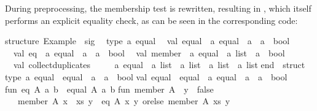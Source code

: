 \begin{isabellebody}
{\isafoldquote}%
%
\isadelimquote
%
\endisadelimquote
%
\begin{isamarkuptext}%
\noindent During preprocessing, the membership test is rewritten,
  resulting in , which itself performs an explicit
  equality check, as can be seen in the corresponding  code:%
\end{isamarkuptext}%
\isamarkuptrue%
%
\isadelimquote
%
\endisadelimquote
%
\isatagquote
%
\begin{isamarkuptext}%
\begin{typewriter}
    structure\ Example\ {\isacharcolon}\ sig\isanewline
\ \ type\ {\isacharprime}a\ equal\isanewline
\ \ val\ equal\ {\isacharcolon}\ {\isacharprime}a\ equal\ {\isacharminus}{\isachargreater}\ {\isacharprime}a\ {\isacharminus}{\isachargreater}\ {\isacharprime}a\ {\isacharminus}{\isachargreater}\ bool\isanewline
\ \ val\ eq\ {\isacharcolon}\ {\isacharprime}a\ equal\ {\isacharminus}{\isachargreater}\ {\isacharprime}a\ {\isacharminus}{\isachargreater}\ {\isacharprime}a\ {\isacharminus}{\isachargreater}\ bool\isanewline
\ \ val\ member\ {\isacharcolon}\ {\isacharprime}a\ equal\ {\isacharminus}{\isachargreater}\ {\isacharprime}a\ list\ {\isacharminus}{\isachargreater}\ {\isacharprime}a\ {\isacharminus}{\isachargreater}\ bool\isanewline
\ \ val\ collect{\isacharunderscore}duplicates\ {\isacharcolon}\isanewline
\ \ \ \ {\isacharprime}a\ equal\ {\isacharminus}{\isachargreater}\ {\isacharprime}a\ list\ {\isacharminus}{\isachargreater}\ {\isacharprime}a\ list\ {\isacharminus}{\isachargreater}\ {\isacharprime}a\ list\ {\isacharminus}{\isachargreater}\ {\isacharprime}a\ list\isanewline
end\ {\isacharequal}\ struct\isanewline
\isanewline
type\ {\isacharprime}a\ equal\ {\isacharequal}\ {\isacharbraceleft}equal\ {\isacharcolon}\ {\isacharprime}a\ {\isacharminus}{\isachargreater}\ {\isacharprime}a\ {\isacharminus}{\isachargreater}\ bool{\isacharbraceright}{\isacharsemicolon}\isanewline
val\ equal\ {\isacharequal}\ {\isacharhash}equal\ {\isacharcolon}\ {\isacharprime}a\ equal\ {\isacharminus}{\isachargreater}\ {\isacharprime}a\ {\isacharminus}{\isachargreater}\ {\isacharprime}a\ {\isacharminus}{\isachargreater}\ bool{\isacharsemicolon}\isanewline
\isanewline
fun\ eq\ A{\isacharunderscore}\ a\ b\ {\isacharequal}\ equal\ A{\isacharunderscore}\ a\ b{\isacharsemicolon}\isanewline
\isanewline
fun\ member\ A{\isacharunderscore}\ {\isacharbrackleft}{\isacharbrackright}\ y\ {\isacharequal}\ false\isanewline
\ \ {\isacharbar}\ member\ A{\isacharunderscore}\ {\isacharparenleft}x\ {\isacharcolon}{\isacharcolon}\ xs{\isacharparenright}\ y\ {\isacharequal}\ eq\ A{\isacharunderscore}\ x\ y\ orelse\ member\ A{\isacharunderscore}\ xs\ y{\isacharsemicolon}\isanewline

\end{typewriter}
\end{isamarkuptext}
\end{isabellebody}
